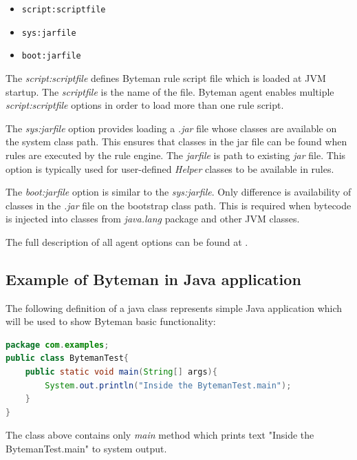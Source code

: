\documentclass[12pt,oneside]{fithesis2}
\begin{document}
\begin{itemize}
	\item	\verb|script:scriptfile|
	\item	\verb|sys:jarfile|
	\item	\verb|boot:jarfile|
\end{itemize}

The \textit{script:scriptfile} defines Byteman rule script file which is loaded at JVM startup. The \textit{scriptfile} is the name of the file. Byteman agent enables multiple \textit{script:scriptfile} options in order to load more than one rule script.

The \textit{sys:jarfile} option provides loading a \textit{.jar} file whose classes are available on the system class path. This ensures that classes in the jar file can be found when rules are executed by the rule engine. The \textit{jarfile} is path to existing \textit{jar} file. This option is typically used for user-defined \textit{Helper} classes to be available in rules.

The \textit{boot:jarfile} option is similar to the \textit{sys:jarfile}. Only difference is availability of classes in the \textit{.jar} file on the bootstrap class path. This is required when bytecode is injected into classes from \textit{java.lang} package and other JVM classes.

The full description of all agent options can be found at \cite[Available -javaagent Options]{byteman_doc}.

\subsection{Example of Byteman in Java application}
The following definition of a java class represents simple Java application which will be used to show Byteman basic functionality:
\begin{lstlisting}[caption = Java class bypassed by the Byteman, label = class_use_case, language=Java]
package com.examples;
public class BytemanTest{
	public static void main(String[] args){
		System.out.println("Inside the BytemanTest.main");
	}
}
\end{lstlisting}
The class above contains only \textit{main} method which prints text "Inside the BytemanTest.main" to system output.
\end{document}
